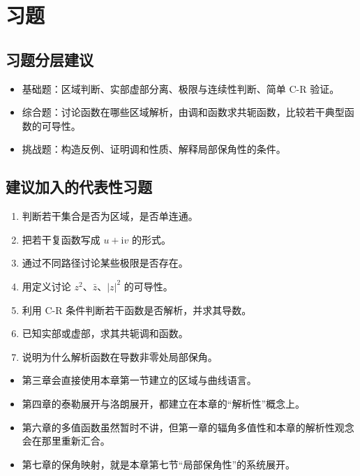 \section{习题}

\subsection*{习题分层建议}
\begin{itemize}
    \item 基础题：区域判断、实部虚部分离、极限与连续性判断、简单 C-R 验证。
    \item 综合题：讨论函数在哪些区域解析，由调和函数求共轭函数，比较若干典型函数的可导性。
    \item 挑战题：构造反例、证明调和性质、解释局部保角性的条件。
\end{itemize}

\subsection*{建议加入的代表性习题}
\begin{enumerate}
    \item 判断若干集合是否为区域，是否单连通。
    \item 把若干复函数写成 $u+\mathrm{i}v$ 的形式。
    \item 通过不同路径讨论某些极限是否存在。
    \item 用定义讨论 $z^2$、$\bar z$、$|z|^2$ 的可导性。
    \item 利用 C-R 条件判断若干函数是否解析，并求其导数。
    \item 已知实部或虚部，求其共轭调和函数。
    \item 说明为什么解析函数在导数非零处局部保角。
\end{enumerate}

\begin{tishi}[与后续章节的联系]
\begin{itemize}
    \item 第三章会直接使用本章第一节建立的区域与曲线语言。
    \item 第四章的泰勒展开与洛朗展开，都建立在本章的``解析性''概念上。
    \item 第六章的多值函数虽然暂时不讲，但第一章的辐角多值性和本章的解析性观念会在那里重新汇合。
    \item 第七章的保角映射，就是本章第七节``局部保角性''的系统展开。
\end{itemize}
\end{tishi}
